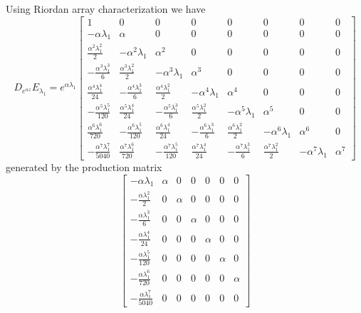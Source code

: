 Using Riordan array characterization we have 
\begin{displaymath}
D_{e^{\alpha z}}E_{\lambda_{1}} = e^{\alpha \lambda_{1}} \left[\begin{matrix}1 & 0 & 0 & 0 & 0 & 0 & 0 & 0\\- \alpha  \lambda_{1} & \alpha  & 0 & 0 & 0 & 0 & 0 & 0\\\frac{\alpha^{2} \lambda_{1}^{2}}{2}  & - \alpha^{2}  \lambda_{1} & \alpha^{2}  & 0 & 0 & 0 & 0 & 0\\- \frac{\alpha^{3} \lambda_{1}^{3}}{6}  & \frac{\alpha^{3} \lambda_{1}^{2}}{2}  & - \alpha^{3}  \lambda_{1} & \alpha^{3}  & 0 & 0 & 0 & 0\\\frac{\alpha^{4} \lambda_{1}^{4}}{24}  & - \frac{\alpha^{4} \lambda_{1}^{3}}{6}  & \frac{\alpha^{4} \lambda_{1}^{2}}{2}  & - \alpha^{4}  \lambda_{1} & \alpha^{4}  & 0 & 0 & 0\\- \frac{\alpha^{5} \lambda_{1}^{5}}{120}  & \frac{\alpha^{5} \lambda_{1}^{4}}{24}  & - \frac{\alpha^{5} \lambda_{1}^{3}}{6}  & \frac{\alpha^{5} \lambda_{1}^{2}}{2}  & - \alpha^{5}  \lambda_{1} & \alpha^{5}  & 0 & 0\\\frac{\alpha^{6} \lambda_{1}^{6}}{720}  & - \frac{\alpha^{6} \lambda_{1}^{5}}{120}  & \frac{\alpha^{6} \lambda_{1}^{4}}{24}  & - \frac{\alpha^{6} \lambda_{1}^{3}}{6}  & \frac{\alpha^{6} \lambda_{1}^{2}}{2}  & - \alpha^{6}  \lambda_{1} & \alpha^{6}  & 0\\- \frac{\alpha^{7} \lambda_{1}^{7}}{5040}  & \frac{\alpha^{7} \lambda_{1}^{6}}{720}  & - \frac{\alpha^{7} \lambda_{1}^{5}}{120}  & \frac{\alpha^{7} \lambda_{1}^{4}}{24}  & - \frac{\alpha^{7} \lambda_{1}^{3}}{6}  & \frac{\alpha^{7} \lambda_{1}^{2}}{2}  & - \alpha^{7}  \lambda_{1} & \alpha^{7} \end{matrix}\right]
\end{displaymath}
generated by the production matrix
\begin{displaymath}
\left[\begin{matrix}- \alpha \lambda_{1} & \alpha & 0 & 0 & 0 & 0 & 0\\- \frac{\alpha \lambda_{1}^{2}}{2} & 0 & \alpha & 0 & 0 & 0 & 0\\- \frac{\alpha \lambda_{1}^{3}}{6} & 0 & 0 & \alpha & 0 & 0 & 0\\- \frac{\alpha \lambda_{1}^{4}}{24} & 0 & 0 & 0 & \alpha & 0 & 0\\- \frac{\alpha \lambda_{1}^{5}}{120} & 0 & 0 & 0 & 0 & \alpha & 0\\- \frac{\alpha \lambda_{1}^{6}}{720} & 0 & 0 & 0 & 0 & 0 & \alpha\\- \frac{\alpha \lambda_{1}^{7}}{5040} & 0 & 0 & 0 & 0 & 0 & 0\end{matrix}\right]
\end{displaymath}
